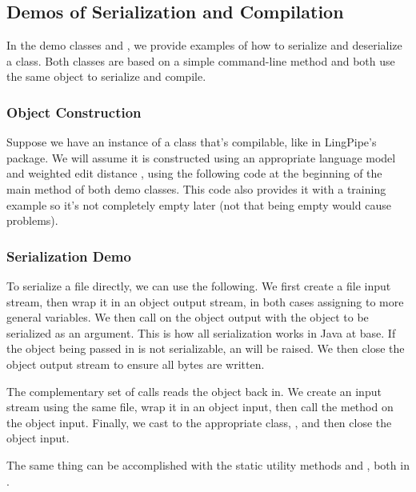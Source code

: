 \subsection{Demos of Serialization and Compilation}

In the demo classes  and
, we provide examples of how to serialize
and deserialize a class.  Both classes are based on a simple
 command-line method and both use the same object
to serialize and compile.


\subsubsection{Object Construction}

Suppose we have an instance of a class that's compilable, like
 in LingPipe's  package.  We will
assume it is constructed using an appropriate language model 
and weighted edit distance , using the following code at
the beginning of the main method of both demo classes.
%
%
This code also provides it with a training example so it's not completely
empty later (not that being empty would cause problems).

\subsubsection{Serialization Demo}

To serialize a file directly, we can use the following.
%
%
We first create a file input stream, then wrap it in an object output
stream, in both cases assigning to more general variables.  We then
call  on the object output with the object to be
serialized as an argument.  This is how all serialization works in
Java at base.  If the object being passed in is not serializable, an
 will be raised.  We then close the
object output stream to ensure all bytes are written.  

The complementary set of calls reads the object back in.  We create an
input stream using the same file, wrap it in an object input, then
call the  method on the object input.  Finally, we
cast to the appropriate class, , and then
close the object input.

The same thing can be accomplished with the static utility methods
 and , both in
.
%

